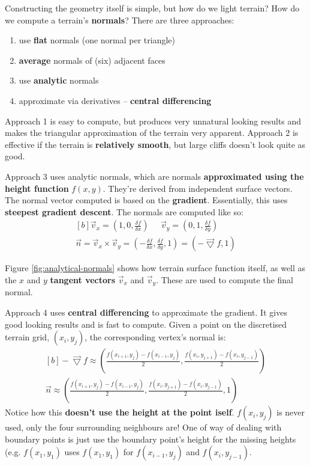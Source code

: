 \documentclass{article}
\begin{document}
Constructing the geometry itself is simple, but how do we light terrain? How do we compute a terrain's \textbf{normals}? There are three approaches:
\begin{enumerate}
	\item use \textbf{flat} normals (one normal per triangle)
	\item \textbf{average} normals of (six) adjacent faces
	\item use \textbf{analytic} normals
	\item approximate via derivatives -- \textbf{central differencing}
\end{enumerate}

Approach 1 is easy to compute, but produces very unnatural looking results and makes the triangular approximation of the terrain very apparent. Approach 2 is effective if the terrain is \textbf{relatively smooth}, but large cliffs doesn't look quite as good.

Approach 3 uses analytic normals, which are normals \textbf{approximated using the height function} $f(x, y)$. They're derived from independent surface vectors. The normal vector computed is based on the \textbf{gradient}. Essentially, this uses \textbf{steepest gradient descent}. The normals are computed like so:
\begin{equation}
\begin{aligned}[b]
	\vec{v}_x = \left( 1, 0, \frac{\delta f}{\delta x} \right)
	\;\;\;\;\;
	\vec{v}_y = \left( 0, 1, \frac{\delta f}{\delta y} \right)
	\\
	\vec{n} = \vec{v}_x \times \vec{v}_y =
	\left( -\frac{\delta f}{\delta x}, \frac{\delta f}{\delta y}, 1 \right)
	= (-\vec{\bigtriangledown} f, 1)
\end{aligned}
	\label{eq:analytical-normals}
\end{equation}

Figure \ref{fig:analytical-normals} shows how terrain surface function itself, as well as the $x$ and $y$ \textbf{tangent vectors} $\vec{v}_x$ and $\vec{v}_y$. These are used to compute the final normal.

Approach 4 uses \textbf{central differencing} to approximate the gradient. It gives good looking results and is fast to compute. Given a point on the discretised terrain grid, $(x_i, y_j)$, the corresponding vertex's normal is:
\begin{equation}
\begin{aligned}[b]
	-\vec{\bigtriangledown} f \approx \left(
		\frac{f(x_{i+1}, y_{j}) - f(x_{i-1}, y_{j})}{2},
		\frac{f(x_{i}, y_{j+1}) - f(x_{i}, y_{j-1})}{2}
	\right)
	\\
	\vec{n} \approx \left(
		\frac{f(x_{i+1}, y_{j}) - f(x_{i-1}, y_{j})}{2},
		\frac{f(x_{i}, y_{j+1}) - f(x_{i}, y_{j-1})}{2},
		1
	\right)
\end{aligned}
\label{eq:central-differencing}
\end{equation}
Notice how this \textbf{doesn't use the height at the point iself}. $f(x_i, y_j)$ is never used, only the four surrounding neighbours are! One of way of dealing with boundary points is just use the boundary point's height for the missing heights (e.g. $f(x_1, y_1)$ uses $f(x_1, y_1)$ for $f(x_{i-1}, y_{j})$ and $f(x_{i}, y_{j-1})$.
\end{document}
